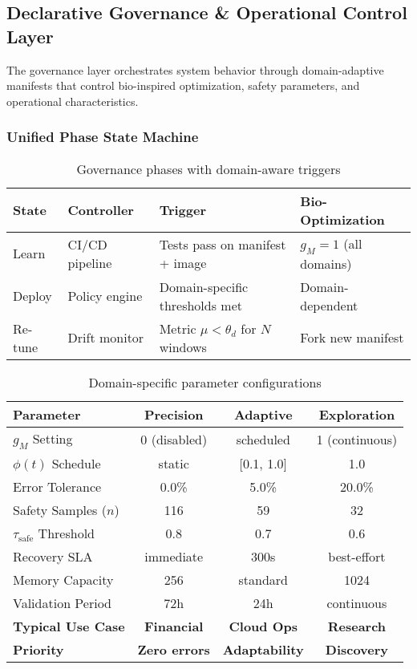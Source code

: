 \documentclass{article}
\begin{document}
\subsection{Declarative Governance \& Operational Control Layer}

The governance layer orchestrates system behavior through domain-adaptive manifests that control bio-inspired optimization, safety parameters, and operational characteristics.

\subsubsection{Unified Phase State Machine}

\begin{table}[H]
\centering
\caption{Governance phases with domain-aware triggers}
\label{tab:governance_phases}
\begin{tabular}{|l|l|l|l|}
\hline
\textbf{State} & \textbf{Controller} & \textbf{Trigger} & \textbf{Bio-Optimization} \\
\hline
Learn & CI/CD pipeline & Tests pass on manifest + image & $g_M=1$ (all domains) \\
Deploy & Policy engine & Domain-specific thresholds met & Domain-dependent \\
Re-tune & Drift monitor & Metric $\mu < \theta_d$ for $N$ windows & Fork new manifest \\
\hline
\end{tabular}
\end{table}

\begin{table}[H]
\centering
\caption{Domain-specific parameter configurations}
\label{tab:domain_comparison}
\begin{tabular}{|l|c|c|c|}
\hline
\textbf{Parameter} & \textbf{Precision} & \textbf{Adaptive} & \textbf{Exploration} \\
\hline
\hline
$g_M$ Setting & 0 (disabled) & scheduled & 1 (continuous) \\
$\phi(t)$ Schedule & static & [0.1, 1.0] & 1.0 \\
Error Tolerance & 0.0\% & 5.0\% & 20.0\% \\
Safety Samples ($n$) & 116 & 59 & 32 \\
$\tau_{\text{safe}}$ Threshold & 0.8 & 0.7 & 0.6 \\
Recovery SLA & immediate & 300s & best-effort \\
Memory Capacity & 256 & standard & 1024 \\
Validation Period & 72h & 24h & continuous \\
\hline
\hline
\textbf{Typical Use Case} & \textbf{Financial} & \textbf{Cloud Ops} & \textbf{Research} \\
\textbf{Priority} & \textbf{Zero errors} & \textbf{Adaptability} & \textbf{Discovery} \\
\hline
\end{tabular}
\end{table}
\end{document}
